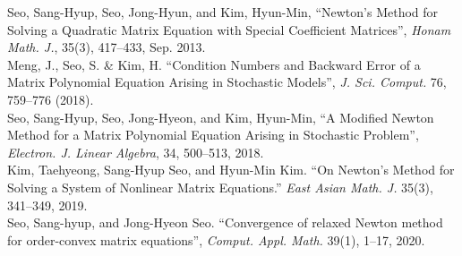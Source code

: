 	Seo, Sang-Hyup, Seo, Jong-Hyun, and Kim, Hyun-Min, ``Newton’s Method for Solving a Quadratic Matrix Equation with Special Coefficient Matrices'', {\it Honam Math. J.}, 35(3), 417--433, Sep. 2013. \\
	Meng, J., Seo, S. \& Kim, H. ``Condition Numbers and Backward Error of a Matrix Polynomial Equation Arising in Stochastic Models'', {\it J. Sci. Comput.} 76, 759--776 (2018). \\
	Seo, Sang-Hyup, Seo, Jong-Hyeon, and Kim, Hyun-Min, ``A Modified Newton Method for a Matrix Polynomial Equation Arising in Stochastic Problem'', {\it Electron. J. Linear Algebra}, 34, 500--513, 2018. \\
	Kim, Taehyeong, Sang-Hyup Seo, and Hyun-Min Kim. ``On Newton's Method for Solving a System of Nonlinear Matrix Equations.'' {\it East Asian Math. J.} 35(3), 341--349, 2019. \\
	Seo, Sang-hyup, and Jong-Hyeon Seo. ``Convergence of relaxed Newton method for order-convex matrix equations'', {\it Comput. Appl. Math.} 39(1), 1--17, 2020.